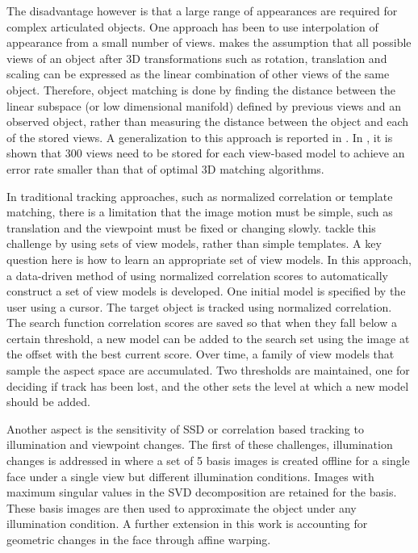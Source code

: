 \documentclass[12pt,letterpaper,doublespaced,ETD]{gt-ece-thesis} %
\begin{document}
\begin{Body}
The disadvantage however is that a large range of appearances are required for complex articulated objects.  One approach has been to use interpolation of appearance from a small number of views.  \cite{1991_JNL_Recog_Ullman} makes the assumption that all possible views of an object after 3D transformations such as rotation, translation and scaling can be expressed as the linear combination of other views of the same object.  Therefore, object matching is done by finding the distance between the linear subspace (or low dimensional manifold) defined by previous views and an observed object, rather than measuring the distance between the object and each of the stored views.  A generalization to this approach is reported in \cite{1990_JNL_Network_Poggio}.  In \cite{1992_JNL_VBR_Breuel}, it is shown that 300 views need to be stored for each view-based model to achieve an error rate smaller than that of optimal 3D matching algorithms.  



In traditional tracking approaches, such as normalized correlation or template matching, there is a limitation that the image motion must be simple, such as translation and the viewpoint must be fixed or changing slowly.  \cite{1993_CNF_Gestures_Darrell} tackle this challenge by using sets of view models, rather than simple templates.  A key question here is how to learn an appropriate set of view models.  In this approach, a data-driven method of using normalized correlation scores to automatically construct a set of view models is developed.  One initial model is specified by the user using a cursor.  The target object is tracked using normalized correlation.  The search function correlation scores are saved so that when they fall below a certain threshold, a new model can be added to the search set using the image at the offset with the best current score.  Over time, a family of view models that sample the aspect space are accumulated.  Two thresholds are maintained, one for deciding if track has been lost, and the other sets the level at which a new model should be added.

Another aspect is the sensitivity of SSD or correlation based tracking to illumination and viewpoint changes.  The first of these challenges, illumination changes is addressed in \cite{1996_TRK_region_Hager} where a set of 5 basis images is created offline for a single face under a single view but different illumination conditions.  Images with maximum singular values in the SVD decomposition are retained for the basis.  These basis images are then used to approximate the object under any illumination condition.  A further extension in this work is accounting for geometric changes in the face through affine warping.  


\end{Body}
\end{document}
